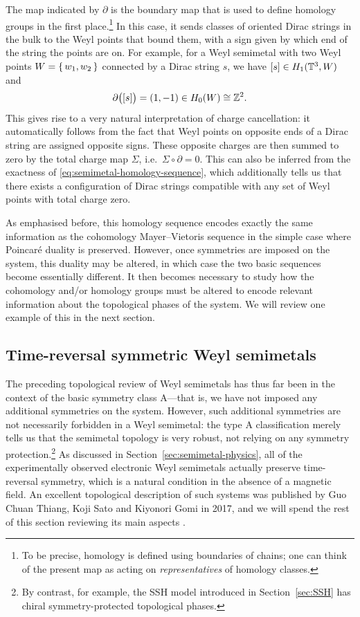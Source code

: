 The map indicated by $\partial$ is the boundary map that is used to define homology groups in the first place.\footnote{
	To be precise, homology is defined using boundaries of chains; one can think of the present map as acting on \emph{representatives} of homology classes.}
In this case, it sends classes of oriented Dirac strings in the bulk to the Weyl points that bound them, with a sign given by which end of the string the points are on. For example, for a Weyl semimetal with two Weyl points $W = \set{w_1,w_2}$ connected by a Dirac string $s$, we have $[s]\in H_1(\mathbb{T}^3,W)$ and
\begin{equation*}
	\partial\big([s]\big) = (1, -1)\in H_0(W)\cong\mathbb{Z}^2. 
\end{equation*}
This gives rise to a very natural interpretation of charge cancellation: it automatically follows from the fact that Weyl points on opposite ends of a Dirac string are assigned opposite signs. These opposite charges are then summed to zero by the total charge map $\Sigma$, i.e.\ $\Sigma\circ\partial = 0$. This can also be inferred from the exactness of \eqref{eq:semimetal-homology-sequence}, which additionally tells us that there exists a configuration of Dirac strings compatible with any set of Weyl points with total charge zero.

As emphasised before, this homology sequence encodes exactly the same information as the cohomology Mayer--Vietoris sequence in the simple case where Poincaré duality is preserved. However, once symmetries are imposed on the system, this duality may be altered, in which case the two basic sequences become essentially different. It then becomes necessary to study how the cohomology and/or homology groups must be altered to encode relevant information about the topological phases of the system. We will review one example of this in the next section.


\subsection{Time-reversal symmetric Weyl semimetals}\label{sec:T-WSMs}

The preceding topological review of Weyl semimetals has thus far been in the context of the basic symmetry class A---that is, we have not imposed any additional symmetries on the system. However, such additional symmetries are not necessarily forbidden in a Weyl semimetal: the type A classification merely tells us that the semimetal topology is very robust, not relying on any symmetry protection.\footnote{
	By contrast, for example, the SSH model introduced in Section~\ref{sec:SSH} has chiral symmetry-protected topological phases.}
As discussed in Section~\ref{sec:semimetal-physics}, all of the experimentally observed electronic Weyl semimetals actually preserve time-reversal symmetry, which is a natural condition in the absence of a magnetic field. An excellent topological description of such systems was published by Guo Chuan Thiang, Koji Sato and Kiyonori Gomi in 2017, and we will spend the rest of this section reviewing its main aspects \cite{Thiang_equivariant}.


